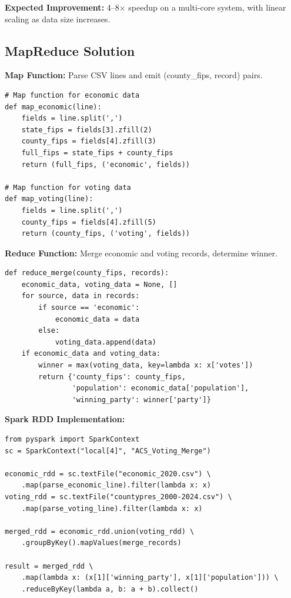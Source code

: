 \documentclass[9pt,a4paper,onecolumn,twoside]{tau-class/tau}
\begin{document}
\textbf{Expected Improvement:} 4--8$\times$ speedup on a multi-core system, with linear scaling as data size increases.

\subsection{MapReduce Solution}

\textbf{Map Function:} Parse CSV lines and emit (county\_fips, record) pairs.

\begin{lstlisting}
# Map function for economic data
def map_economic(line):
    fields = line.split(',')
    state_fips = fields[3].zfill(2)
    county_fips = fields[4].zfill(3)
    full_fips = state_fips + county_fips
    return (full_fips, ('economic', fields))

# Map function for voting data  
def map_voting(line):
    fields = line.split(',')
    county_fips = fields[4].zfill(5)
    return (county_fips, ('voting', fields))
\end{lstlisting}

\textbf{Reduce Function:} Merge economic and voting records, determine winner.

\begin{lstlisting}
def reduce_merge(county_fips, records):
    economic_data, voting_data = None, []
    for source, data in records:
        if source == 'economic':
            economic_data = data
        else:
            voting_data.append(data)
    if economic_data and voting_data:
        winner = max(voting_data, key=lambda x: x['votes'])
        return {'county_fips': county_fips,
                'population': economic_data['population'],
                'winning_party': winner['party']}
\end{lstlisting}

\textbf{Spark RDD Implementation:}

\begin{lstlisting}
from pyspark import SparkContext
sc = SparkContext("local[4]", "ACS_Voting_Merge")

economic_rdd = sc.textFile("economic_2020.csv") \
    .map(parse_economic_line).filter(lambda x: x)
voting_rdd = sc.textFile("countypres_2000-2024.csv") \
    .map(parse_voting_line).filter(lambda x: x)

merged_rdd = economic_rdd.union(voting_rdd) \
    .groupByKey().mapValues(merge_records)

result = merged_rdd \
    .map(lambda x: (x[1]['winning_party'], x[1]['population'])) \
    .reduceByKey(lambda a, b: a + b).collect()
\end{lstlisting}
\end{document}
